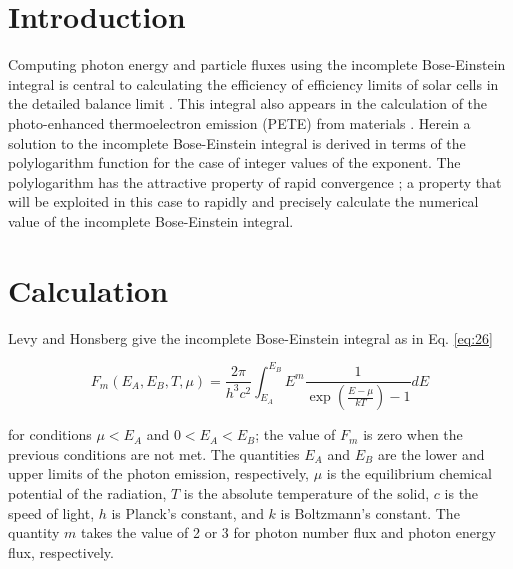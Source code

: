 \documentclass[letterpaper,12pt]{article}
\title{\Title}
\author{\AuthorName}
\begin{document}
\maketitle


\begin{abstract}
The canonical incomplete Bose-Einstein integral is expressed in terms of a finite sum of polylogarithm functions.
\end{abstract}


\section{Introduction}
Computing photon energy and particle fluxes using the incomplete Bose-Einstein integral is central to calculating the efficiency of efficiency limits of solar cells in the detailed balance limit \cite{10.1063/1.1736034}. This integral also appears in the calculation of the photo-enhanced thermoelectron emission (PETE) from materials \cite{10.1038/nmat2814}. Herein a solution to the incomplete Bose-Einstein integral is derived in terms of the polylogarithm function for the case of integer values of the exponent. The polylogarithm has the attractive property of rapid convergence \cite{http://academic.reed.edu/physics/faculty/crandall/papers/Polylog}; a property that will be exploited in this case to rapidly and precisely calculate the numerical value of the incomplete Bose-Einstein integral.


\section{Calculation}
Levy and Honsberg \cite{10.1016/j.sse.2006.06.017} give the incomplete Bose-Einstein integral as in Eq. \ref{eq:26}

\begin{equation} \label{eq:26}
F_{m}(E_{A},E_{B},T,\mu) = \frac{2 \pi}{h^{3}c^{2}} \int_{E_{A}}^{E_{B}} E^{m} \frac{1}{\exp \left( \frac{E - \mu}{kT} \right) - 1} dE 
\end{equation}


\noindent for conditions $\mu < E_{A}$ and $0 < E_{A} < E_{B}$; the value of $F_{m}$ is zero when the previous conditions are not met. The quantities $E_{A}$ and $E_{B}$ are the lower and upper limits of the photon emission, respectively, $\mu$ is the equilibrium chemical potential of the radiation, $T$ is the absolute temperature of the solid, $c$ is the speed of light, $h$ is Planck's constant, and $k$ is Boltzmann's constant. The quantity $m$ takes the value of 2 or 3 for photon number flux and photon energy flux, respectively.
\end{document}
